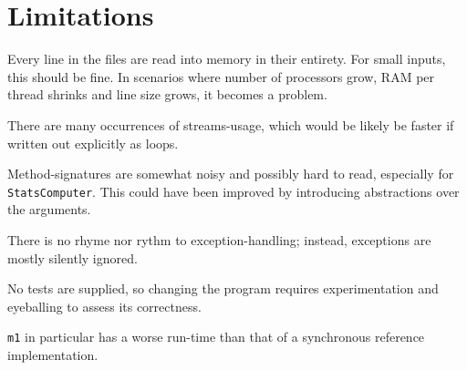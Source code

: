 \documentclass[a4paper,11pt]{article}
\begin{document}
\section{Limitations}

Every line in the files are read into memory in their entirety.  For
small inputs, this should be fine.  In scenarios where number of
processors grow, RAM per thread shrinks and line size grows, it
becomes a problem.

There are many occurrences of streams-usage, which would be likely be
faster if written out explicitly as loops.

Method-signatures are somewhat noisy and possibly hard to read,
especially for \texttt{StatsComputer}.  This could have been improved
by introducing abstractions over the arguments.

There is no rhyme nor rythm to exception-handling; instead, exceptions
are mostly silently ignored.

No tests are supplied, so changing the program requires
experimentation and eyeballing to assess its correctness.

\texttt{m1} in particular has a worse run-time than that of a
synchronous reference implementation.
\end{document}
